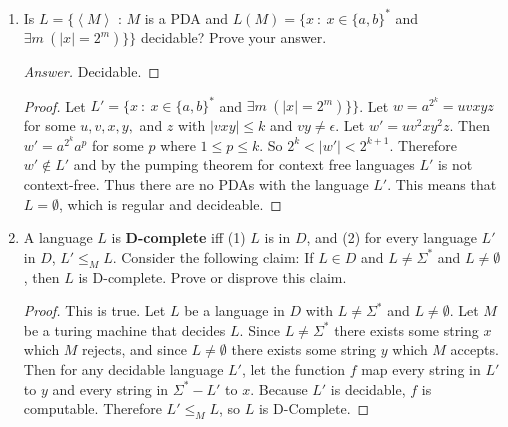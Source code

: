 \documentclass[10pt]{article}
\newcommand{\card}[1]{\left| #1 \right|}
\newcommand{\brackets}[1]{\left< #1 \right>}
\begin{document}
\begin{enumerate}[1)]
\begin{proof}[Proof]
If $t_3$ is in the top left, then the only possibility for the top row is $t_3t_2t_1$.  So the second row must start with $t_2$.  So there is no tile we can place in the center of the second row.  Therefore we cannot tile any finite surface in this case.\\

\end{proof}


\item
Is $L = \{\brackets{M}$ : $M$ is a PDA and $L(M) = \{x\ :\ x \in \{a, b\}^*$ and $\exists m\ (\card{x} = 2^m)\}\}$ decidable?  Prove your answer.
\begin{proof}[Answer]
Decidable.
\end{proof}
\begin{proof}[Proof]
Let $L' = \{x\ :\ x \in \{a, b\}^*$ and $\exists m\ (\card{x} = 2^m)\}\}$.  Let $w = a^{2^k} = uvxyz$ for some $u, v, x, y,$ and $z$ with $\card{vxy} \leq k$ and $vy \neq \epsilon$.  Let $w' = uv^2xy^2z$.  Then $w' = a^{2^k}a^p$ for some $p$ where $1 \leq p \leq k$.  So $2^k < \card{w'} < 2^{k+1}$.  Therefore $w' \not \in L'$ and by the pumping theorem for context free languages $L'$ is not context-free.  Thus there are no PDAs with the language $L'$.  This means that $L = \emptyset$, which is regular and decideable.
\end{proof}


\item
A language $L$ is \textbf{D-complete} iff (1)  $L$ is in $D$, and (2) for every language  $L'$ in $D$,  $L' \leq _M L$.  Consider the following claim: If $L \in D$ and $L \neq \Sigma ^*$ and $L \neq \emptyset$, then $L$ is D-complete.  Prove or disprove this claim.
\begin{proof}[Proof]
This is true.  Let $L$ be a language in $D$ with $L \neq \Sigma ^*$ and $L \neq \emptyset$.  Let $M$ be a turing machine that decides $L$.  Since $L \neq \Sigma ^*$ there exists some string $x$ which $M$ rejects, and since $L \neq \emptyset$ there exists some string $y$ which $M$ accepts.  Then for any decidable language $L'$, let the function $f$ map every string in $L'$ to $y$ and every string in $\Sigma ^* - L'$ to $x$.  Because $L'$ is decidable, $f$ is computable.  Therefore $L' \leq _M L$, so $L$ is D-Complete.
\end{proof}

\pagebreak


\end{enumerate}
\end{document}
